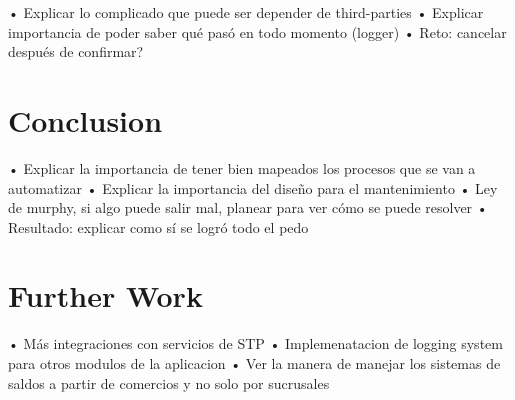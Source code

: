 • Explicar lo complicado que puede ser depender de third-parties
• Explicar importancia de poder saber qué pasó en todo momento (logger)
• Reto: cancelar después de confirmar?



\section{Conclusion}

• Explicar la importancia de tener bien mapeados los procesos que se van a automatizar
• Explicar la importancia del diseño para el mantenimiento
• Ley de murphy, si algo puede salir mal, planear para ver cómo se puede resolver
• Resultado: explicar como sí se logró todo el pedo

\section{Further Work}

• Más integraciones con servicios de STP
• Implemenatacion de logging system para otros modulos de la aplicacion
• Ver la manera de manejar los sistemas de saldos a partir de comercios y no solo por sucrusales